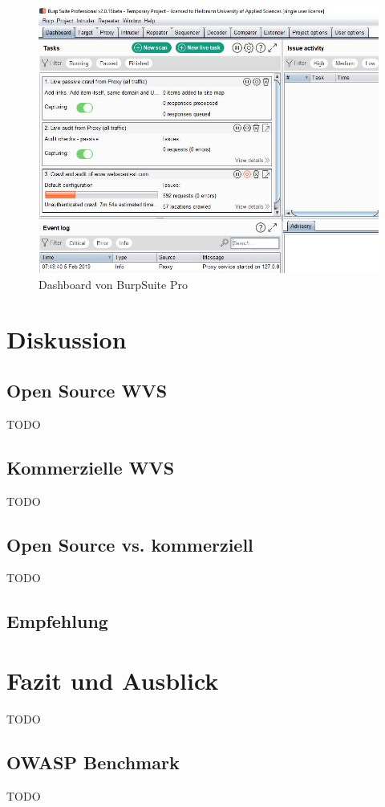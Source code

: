\documentclass[12pt,oneside,a4paper,parskip]{scrbook}
\begin{document}
  \begin{figure}[!htb]
    \includegraphics[width=1\textwidth]{Images/BurpSuitePro}
    \caption[Dashboard von BurpSuite Pro]{Dashboard von BurpSuite Pro}
  \end{figure}

\chapter{Diskussion}
  \section{Open Source WVS}
  TODO
  \section{Kommerzielle WVS}
  TODO
  \section{Open Source vs. kommerziell}
  TODO
  \section{Empfehlung}


\chapter{Fazit und Ausblick}
TODO
  \section{OWASP Benchmark}
  TODO
\end{document}
